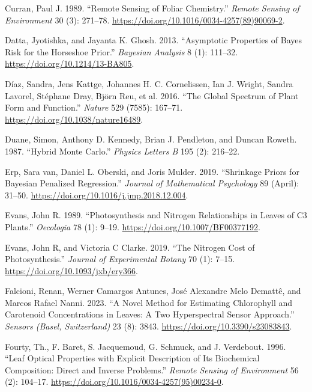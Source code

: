 \documentclass[
  letterpaper,
  DIV=11,
  numbers=noendperiod]{scrartcl}
\newlength{\cslhangindent}
\newlength{\cslentryspacingunit} %
\newenvironment{CSLReferences}[2] %
 {%
  \setlength{\parindent}{0pt}
  \ifodd #1
  \let\oldpar\par
  \def\par{\hangindent=\cslhangindent\oldpar}
  \fi
  \setlength{\parskip}{#2\cslentryspacingunit}
 }%
 {}
\begin{document}
\begin{CSLReferences}{1}{0}
\leavevmode{}%
Curran, Paul J. 1989. {``Remote Sensing of Foliar Chemistry.''}
\emph{Remote Sensing of Environment} 30 (3): 271--78.
\url{https://doi.org/10.1016/0034-4257(89)90069-2}.

\leavevmode{}%
Datta, Jyotishka, and Jayanta K. Ghosh. 2013. {``Asymptotic Properties
of Bayes Risk for the Horseshoe Prior.''} \emph{Bayesian Analysis} 8
(1): 111--32. \url{https://doi.org/10.1214/13-BA805}.

\leavevmode{}%
Díaz, Sandra, Jens Kattge, Johannes H. C. Cornelissen, Ian J. Wright,
Sandra Lavorel, Stéphane Dray, Björn Reu, et al. 2016. {``The Global
Spectrum of Plant Form and Function.''} \emph{Nature} 529 (7585):
167--71. \url{https://doi.org/10.1038/nature16489}.

\leavevmode{}%
Duane, Simon, Anthony D. Kennedy, Brian J. Pendleton, and Duncan Roweth.
1987. {``Hybrid Monte Carlo.''} \emph{Physics Letters B} 195 (2):
216--22.

\leavevmode{}%
Erp, Sara van, Daniel L. Oberski, and Joris Mulder. 2019. {``Shrinkage
Priors for Bayesian Penalized Regression.''} \emph{Journal of
Mathematical Psychology} 89 (April): 31--50.
\url{https://doi.org/10.1016/j.jmp.2018.12.004}.

\leavevmode{}%
Evans, John R. 1989. {``Photosynthesis and Nitrogen Relationships in
Leaves of C3 Plants.''} \emph{Oecologia} 78 (1): 9--19.
\url{https://doi.org/10.1007/BF00377192}.

\leavevmode{}%
Evans, John R, and Victoria C Clarke. 2019. {``The Nitrogen Cost of
Photosynthesis.''} \emph{Journal of Experimental Botany} 70 (1): 7--15.
\url{https://doi.org/10.1093/jxb/ery366}.

\leavevmode{}%
Falcioni, Renan, Werner Camargos Antunes, José Alexandre Melo Demattê,
and Marcos Rafael Nanni. 2023. {``A Novel Method for Estimating
Chlorophyll and Carotenoid Concentrations in Leaves: A Two Hyperspectral
Sensor Approach.''} \emph{Sensors (Basel, Switzerland)} 23 (8): 3843.
\url{https://doi.org/10.3390/s23083843}.

\leavevmode{}%
Fourty, Th., F. Baret, S. Jacquemoud, G. Schmuck, and J. Verdebout.
1996. {``Leaf Optical Properties with Explicit Description of Its
Biochemical Composition: Direct and Inverse Problems.''} \emph{Remote
Sensing of Environment} 56 (2): 104--17.
\url{https://doi.org/10.1016/0034-4257(95)00234-0}.


\end{CSLReferences}
\end{document}
